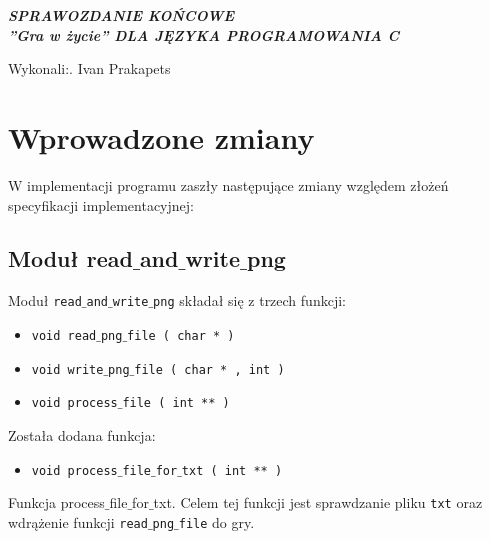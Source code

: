 \documentclass[a4paper, 12pt]{article}
\newcommand{\mainmatter}{\clearpage \cfoot{\thepage\ of \pageref{LastPage}}
\pagenumbering{arabic}}
\begin{document}
	\begin{titlepage}
		
		\begin{center}
    	\vspace{5cm}
    		\Large\textit{\textbf{SPRAWOZDANIE KOŃCOWE
    		\\''Gra w życie'' DLA JĘZYKA PROGRAMOWANIA C}}\\ 
		\vspace{15cm}
		\end{center} 

		\hfill\begin{minipage}{0.5\textwidth}
			\Large Wykonali:. Ivan Prakapets \newline
		\vspace{\baselineskip}
		\end{minipage}
	\end{titlepage}
\newpage
\mainmatter
\setlength{\headheight}{15pt}
\doublespacing
\tableofcontents
\newpage
	\section{Wprowadzone zmiany}
			\hspace*{1cm} W implementacji programu zaszły następujące zmiany względem złożeń specyfikacji implementacyjnej:
		\subsection{Moduł read$\_$and$\_$write$\_$png}
			\hspace*{1cm} Moduł \texttt{read$\_$and$\_$write$\_$png} składał się z trzech funkcji:
			\renewcommand{\labelitemi}{$\ast$}
		\begin{itemize}
			\item \texttt{void read$\_$png$\_$file ( char * )}
			\item \texttt{void write$\_$png$\_$file ( char * , int )}
			\item \texttt{void process$\_$file ( int ** )}
		\end{itemize}
			\hspace*{1cm} Została dodana funkcja: 
		\begin{itemize}
			\item \texttt{void process$\_$file$\_$for$\_$txt ( int ** )}
		\end{itemize}
			\hspace*{1cm} Funkcja process$\_$file$\_$for$\_$txt. Celem tej funkcji jest sprawdzanie pliku \texttt{txt} oraz wdrążenie funkcji \texttt{read$\_$png$\_$file} do gry.
			
\end{document}
